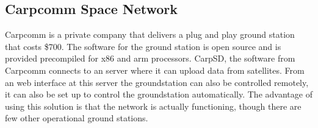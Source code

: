 \subsection{Carpcomm Space Network}
Carpcomm is a private company that delivers a plug and play ground station \cite{carpcomm-gs1} that costs \$700. The software for the ground station is open source and is provided precompiled for x86 and arm processors.
CarpSD, the software from Carpcomm connects to an server where it can upload data from satellites. From an web interface at this server the groundstation can also be controlled remotely, it can also be set up to control the groundstation automatically.
The advantage of using this solution is that the network is actually functioning, though there are few other operational ground stations.
